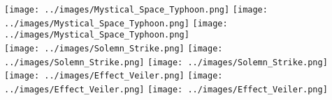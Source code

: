 \documentclass{scrartcl}
\begin{document}
    \centering


    \texttt{[image: ../images/Mystical\_Space\_Typhoon.png]}
    \texttt{[image: ../images/Mystical\_Space\_Typhoon.png]}
    \texttt{[image: ../images/Mystical\_Space\_Typhoon.png]}
    \\
    \texttt{[image: ../images/Solemn\_Strike.png]}
    \texttt{[image: ../images/Solemn\_Strike.png]}
    \texttt{[image: ../images/Solemn\_Strike.png]}
    \\
    \texttt{[image: ../images/Effect\_Veiler.png]}
    \texttt{[image: ../images/Effect\_Veiler.png]}
    \texttt{[image: ../images/Effect\_Veiler.png]}
\end{document}
